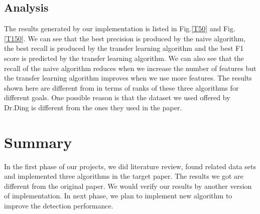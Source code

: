 \documentclass[conference]{IEEEtran}
\begin{document}
\subsection{Analysis}
The results  generated by our implementation is listed in Fig.\ref{T50} and Fig. \ref{T150}. We can see that the best precision is produced by the naive algorithm, the best recall is produced by the transfer learning algorithm and the best F1 score is predicted by the transfer learning algorithm. We can also see that the recall of the naive algorithm reduces when we increase the number of features but the transfer learning algorithm improves when we use more features. The results shown here are different from \cite{ding2011subkilometer} in terms of ranks of these three algorithms for different goals. One possible reason is that the dataset we used offered by Dr.Ding is different from the ones they used in the paper.

\section{Summary}
In the first phase of our projects, we  did literature review, found related data sets and implemented three algorithms in the target paper. The results we got are different from the original paper. We would verify our results by another version of implementation.  In next phase, we plan to implement new algorithm to improve the detection performance.
 



\end{document}
